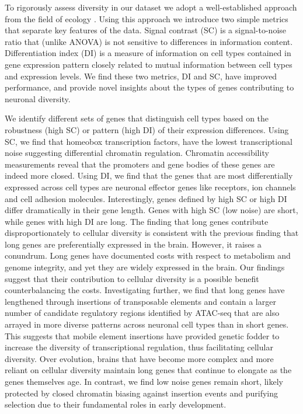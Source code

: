 To rigorously assess diversity in our dataset we adopt a well-established approach from the field of ecology \cite{Simpson_1949}. Using this approach we introduce two simple metrics that separate key features of the data. Signal contrast (SC) is a signal-to-noise ratio that (unlike ANOVA) is not sensitive to differences in information content. Differentiation index (DI) is a measure of information on cell types contained in gene expression pattern closely related to mutual information between cell types and expression levels. We find these two metrics, DI and SC, have improved performance, and provide novel insights about the types of genes contributing to neuronal diversity.

We identify different sets of genes that distinguish cell types based on the robustness (high SC) or pattern (high DI) of their expression differences. Using SC, we find that homeobox transcription factors, have the lowest transcriptional noise suggesting differential chromatin regulation. Chromatin accessibility measurements reveal that the promoters and gene bodies of these genes are indeed more closed. Using DI, we find that the genes that are most differentially expressed across cell types are neuronal effector genes like receptors, ion channels and cell adhesion molecules. Interestingly, genes defined by high SC or high DI differ dramatically in their gene length. Genes with high SC (low noise) are short, while genes with high DI are long. The finding that long genes contribute disproportionately to cellular diversity is consistent with the previous finding that long genes are preferentially expressed in the brain. However, it raises a conundrum. Long genes have documented costs with respect to metabolism and genome integrity, and yet they are widely expressed in the brain. Our findings suggest that their contribution to cellular diversity is a possible benefit counterbalancing the costs. Investigating further, we find that long genes have lengthened through insertions of transposable elements and contain a larger number of candidate regulatory regions identified by ATAC-seq that are also arrayed in more diverse patterns across neuronal cell types than in short genes. This suggests that mobile element insertions have provided genetic fodder to increase the diversity of transcriptional regulation, thus facilitating cellular diversity. Over evolution, brains that have become more complex and more reliant on cellular diversity maintain long genes that continue to elongate as the genes themselves age. In contrast, we find low noise genes remain short, likely protected by closed chromatin biasing against insertion events and purifying selection due to their fundamental roles in early development.

